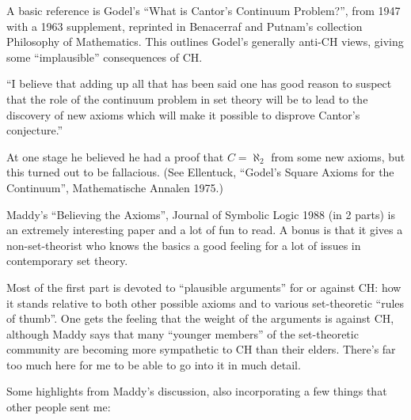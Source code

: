 A basic reference is Godel's ``What is Cantor's Continuum Problem?'', from
1947 with a 1963 supplement, reprinted in Benacerraf and Putnam's collection
Philosophy of Mathematics.  This outlines Godel's generally anti-CH views,
giving some ``implausible'' consequences of CH.

  ``I believe that adding up all that has been said one has good reason
   to suspect that the role of the continuum problem in set theory will
   be to lead to the discovery of new axioms which will make it possible
   to disprove Cantor's conjecture.''

At one stage he believed he had a proof that $C = \aleph_2$ from some new
axioms, but this turned out to be fallacious.  (See Ellentuck, ``Godel's
Square Axioms for the Continuum'', Mathematische Annalen 1975.)

Maddy's  ``Believing the Axioms'',
Journal of Symbolic Logic 1988 (in 2 parts) is an extremely
interesting paper and a lot of fun to read.  A bonus is that it gives
a non-set-theorist who knows the basics a good feeling for a lot of
issues in contemporary set theory.

Most of the first part is devoted to ``plausible arguments'' for or against
CH: how it stands relative to both other possible axioms and to various
set-theoretic ``rules of thumb''.  One gets the feeling that the weight of
the arguments is against CH, although Maddy says that many ``younger members''
of the set-theoretic community are becoming more sympathetic to CH than
their elders.  There's far too much here for me to be able to go into it
in much detail.

Some highlights from Maddy's discussion, also incorporating a few things that
other people sent me:

